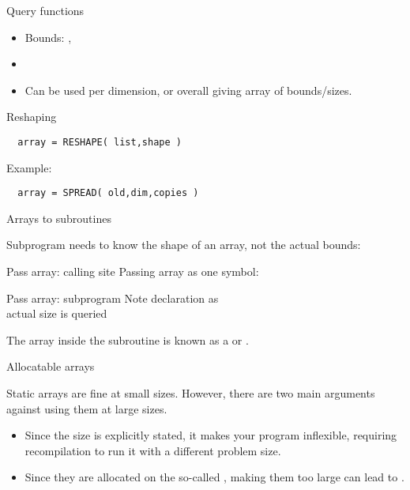 \begin{slide}{Query functions}
  \label{sl:farray-query}
  \begin{itemize}
  \item Bounds: , 
  \item {}
  \item Can be used per dimension, or overall giving array of bounds/sizes.
  \end{itemize}
\end{slide}

 {Reshaping}

\begin{lstlisting}
  array = RESHAPE( list,shape )
\end{lstlisting}
Example:

\begin{lstlisting}
  array = SPREAD( old,dim,copies )
\end{lstlisting}

 {Arrays to subroutines}

Subprogram needs to know the shape of an array, not the actual bounds:

\begin{block}{Pass array: calling site}
  \label{sl:farray-pass1d-main}
  Passing array as one symbol:
\end{block}

\begin{block}{Pass array: subprogram}
  \label{sl:farray-pass1d-subr}
  Note declaration as \\
  actual size is queried
\end{block}

The array inside the subroutine is known as a
 or
.

 {Allocatable arrays}
\label{sec:allocatable}

Static arrays are fine at small sizes. However, 
there are two main arguments against using them at large sizes.
\begin{itemize}
\item Since the size is explicitly stated, it makes your program
  inflexible, requiring recompilation to run it with a different
  problem size.
\item Since they are allocated on the so-called ,
  making them too large can lead to .
\end{itemize}

